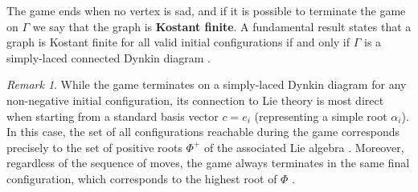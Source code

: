 \documentclass[11pt,a4paper]{amsart}
\theoremstyle{plain}
\theoremstyle{definition}
\theoremstyle{remark}
\newtheorem{remark}[theorem]{Remark}
\begin{document}
The game ends when no vertex is sad, and if it is possible to terminate the game on $\Gamma$ we say that the graph is \textbf{Kostant finite}. A fundamental result states that a graph is Kostant finite for all valid initial configurations if and only if $\Gamma$ is a simply-laced connected Dynkin diagram \cite{chen2017}.

\begin{remark}
    While the game terminates on a simply-laced Dynkin diagram for any non-negative initial configuration, its connection to Lie theory is most direct when starting from a standard basis vector $c = e_i$ (representing a simple root $\alpha_i$). In this case, the set of all configurations reachable during the game corresponds precisely to the set of positive roots $\Phi^+$ of the associated Lie algebra \cite{chen2017}. Moreover, regardless of the sequence of moves, the game always terminates in the same final configuration, which corresponds to the highest root of $\Phi$ \cite{chen2017}.
\end{remark}
\end{document}
